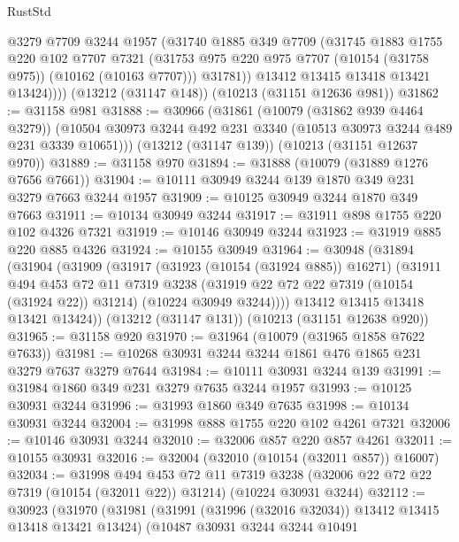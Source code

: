 \begin{lexlean}{RustStd}
\begin{coremodule}
{\begin{coremodule}
{{{{{{{{{{{{{{{{{{{{{{{{{{            @3279
            @7709
            @3244
            @1957
            (@31740
              @1885
              @349
              @7709
              (@31745
                @1883
                @1755
                @220
                @102
                @7707
                @7321
                (@31753 @975 @220 @975 @7707 (@10154 (@31758 @975)) (@10162 (@10163 @7707)))
                @31781))
            @13412
            @13415
            @13418
            @13421
            @13424))))
    (@13212 (@31147 @148))
    (@10213 (@31151 @12636 @981))
@31862 := @31158 @981
@31888 := @30966
    (@31861
      (@10079 (@31862 @939 @4464 @3279))
      (@10504 @30973 @3244 @492 @231 @3340 (@10513 @30973 @3244 @489 @231 @3339 @10651)))
    (@13212 (@31147 @139))
    (@10213 (@31151 @12637 @970))
@31889 := @31158 @970
@31894 := @31888 (@10079 (@31889 @1276 @7656 @7661))
@31904 := @10111 @30949 @3244 @139 @1870 @349 @231 @3279 @7663 @3244 @1957
@31909 := @10125 @30949 @3244 @1870 @349 @7663
@31911 := @10134 @30949 @3244
@31917 := @31911 @898 @1755 @220 @102 @4326 @7321
@31919 := @10146 @30949 @3244
@31923 := @31919 @885 @220 @885 @4326
@31924 := @10155 @30949
@31964 := @30948
    (@31894
      (@31904
        (@31909
          (@31917
            (@31923 (@10154 (@31924 @885)) @16271)
            (@31911
              @494
              @453
              @72
              @11
              @7319
              @3238
              (@31919 @22 @72 @22 @7319 (@10154 (@31924 @22)) @31214)
              (@10224 @30949 @3244))))
        @13412
        @13415
        @13418
        @13421
        @13424))
    (@13212 (@31147 @131))
    (@10213 (@31151 @12638 @920))
@31965 := @31158 @920
@31970 := @31964 (@10079 (@31965 @1858 @7622 @7633))
@31981 := @10268 @30931 @3244 @3244 @1861 @476 @1865 @231 @3279 @7637 @3279 @7644
@31984 := @10111 @30931 @3244 @139
@31991 := @31984 @1860 @349 @231 @3279 @7635 @3244 @1957
@31993 := @10125 @30931 @3244
@31996 := @31993 @1860 @349 @7635
@31998 := @10134 @30931 @3244
@32004 := @31998 @888 @1755 @220 @102 @4261 @7321
@32006 := @10146 @30931 @3244
@32010 := @32006 @857 @220 @857 @4261
@32011 := @10155 @30931
@32016 := @32004 (@32010 (@10154 (@32011 @857)) @16007)
@32034 := @31998
    @494
    @453
    @72
    @11
    @7319
    @3238
    (@32006 @22 @72 @22 @7319 (@10154 (@32011 @22)) @31214)
    (@10224 @30931 @3244)
@32112 := @30923
    (@31970
      (@31981
        (@31991 (@31996 (@32016 @32034)) @13412 @13415 @13418 @13421 @13424)
        (@10487
          @30931
          @3244
          @3244
          @10491
}}}}}}}}}}}}}}}}}}}}}}}}}}
\end{coremodule}}
\end{coremodule}
\end{lexlean}
